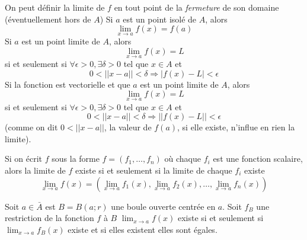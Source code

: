 \begin{mydef}
	On peut définir la limite de $f$ en tout point de la \emph{fermeture} de son domaine (éventuellement hors de $A$)
	Si $a$ est un point isolé de $A$, alors
	\[ \lim_{x \to a} f(x) = f(a) \]
	Si $a$ est un point limite de $A$, alors
	\[ \lim_{x \to a} f(x) = L \]
	si et seulement si $\forall \epsilon >0, \exists \delta > 0$ tel que $x \in A$ et
	\[ 0 < || x - a || < \delta \Rightarrow |f(x) - L| < \epsilon \]
	Si la fonction est vectorielle et que $a$ est un point limite de $A$, alors
	\[ \lim_{x \to a} f(x) = L \]
	si et seulement si $\forall \epsilon >0, \exists \delta > 0$ tel que $x \in A$ et
	\[ 0 < || x - a || < \delta \Rightarrow ||f(x) - L|| < \epsilon \]
	(comme on dit $0 < ||x - a||$, la valeur de $f(a)$, si elle existe, n'influe en rien la limite).

	Si on écrit $f$ sous la forme $f = (f_1 , \dots , f_n)$ où chaque $f_i$ est une fonction scalaire, alors la limite de $f$ existe si et seulement si la limite de chaque $f_i$ existe
	\[ \lim_{x \to a} f(x) = \left( \lim_{x \to a} f_1(x), \lim_{x \to a} f_2(x), \dots , \lim_{x \to a} f_n(x) \right) \]
\end{mydef}

\begin{myprop}
	Soit $a \in \bar{A}$ est $B = B(a; r)$ une boule ouverte centrée en $a$.
	Soit $f_B$ une restriction de la fonction $f$ à $B$
	\( \lim_{x \to a}f(x) \)
	existe si et seulement si
	\( \lim_{x \to a}f_B(x) \)
	existe et si elles existent elles sont égales.
\end{myprop}

